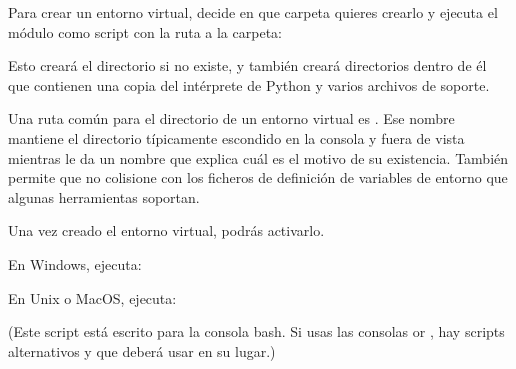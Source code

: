 \documentclass[a5paper,10pt,spanish]{sphinxmanual}
\begin{document}
\sphinxAtStartPar
Para crear un entorno virtual, decide en que carpeta quieres crearlo y ejecuta el módulo  como script con la ruta a la carpeta:

\begin{sphinxVerbatim}[commandchars=\\\{\}]
   
\end{sphinxVerbatim}

\sphinxAtStartPar
Esto creará el directorio  si no existe, y también creará directorios dentro de él que contienen una copia del intérprete de Python y varios archivos de soporte.

\sphinxAtStartPar
Una ruta común para el directorio de un entorno virtual es . Ese nombre mantiene el directorio típicamente escondido en la consola y fuera de vista mientras le da un nombre que explica cuál es el motivo de su existencia. También permite que no colisione con los ficheros de definición de variables de entorno  que algunas herramientas soportan.

\sphinxAtStartPar
Una vez creado el entorno virtual, podrás activarlo.

\sphinxAtStartPar
En Windows, ejecuta:

\begin{sphinxVerbatim}[commandchars=\\\{\}]
\PYGZbs{}\PYGZbs{}
\end{sphinxVerbatim}

\sphinxAtStartPar
En Unix o MacOS, ejecuta:

\begin{sphinxVerbatim}[commandchars=\\\{\}]
 
\end{sphinxVerbatim}

\sphinxAtStartPar
(Este script está escrito para la consola bash. Si usas las consolas  or , hay scripts alternativos  y  que deberá usar en su lugar.)
\end{document}
